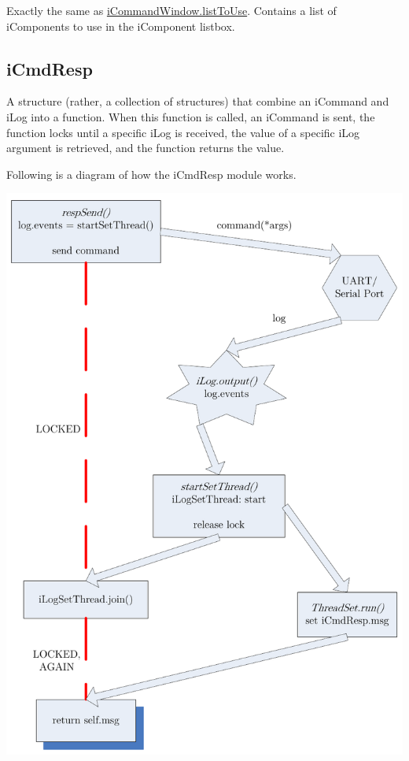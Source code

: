 \documentclass[12pt,letterpaper]{article}
\begin{document}
Exactly the same as \hyperref[4.5.2.1.1]{iCommandWindow.listToUse}. Contains a list of iComponents to use in the iComponent listbox.



%
%
\subsection{iCmdResp}
\label{4.7}

A structure (rather, a collection of structures) that combine an iCommand and iLog into a function. When this function is called, an iCommand is sent, the function locks until a specific iLog is received, the value of a specific iLog argument is retrieved, and the function returns the value.

Following is a diagram of how the iCmdResp module works.

\begin{center}
\includegraphics[scale=1]{hobbes_icmdresp.pdf}
\end{center}
\end{document}
